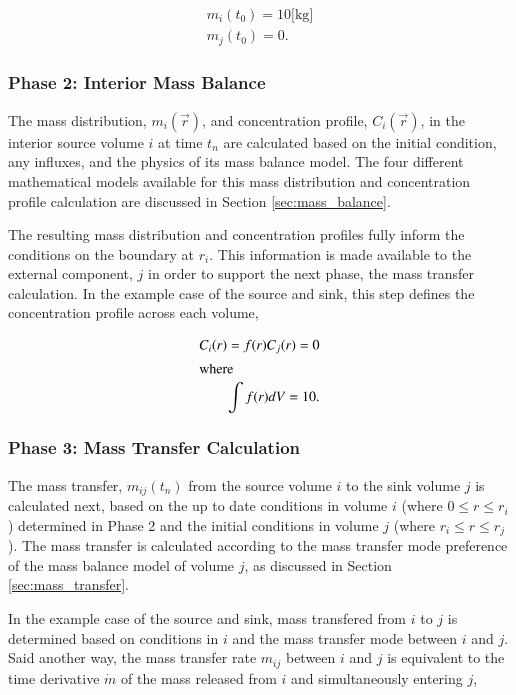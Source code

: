 \begin{align}
 m_i(t_0) = 10 \mbox{[kg]}\\
 m_j(t_0) = 0.
\end{align}

\subsubsection{Phase 2: Interior Mass Balance}

The mass distribution, $m_i(\vec{r})$, and concentration profile, 
$C_i(\vec{r})$, in the interior source volume $i$ at time $t_n$ are calculated 
based on the initial condition, any influxes, and the physics of its mass 
balance model.  The four different mathematical models available for this mass 
distribution and concentration profile calculation are discussed in Section 
\ref{sec:mass_balance}.

The resulting mass distribution and concentration profiles fully inform
the conditions on the boundary at $r_i$. This information is made available
to the external component, $j$ in order to support the next phase, the mass
transfer calculation. In the example case of the source and sink, this step 
defines the concentration profile across each volume,

\begin{align}
C_i(r) = f(r)
C_j(r) = 0\\
\intertext{where}
\int f(r)dV = 10.
\end{align}

\subsubsection{Phase 3: Mass Transfer Calculation}

The mass transfer, $m_{ij}(t_n)$ from the source volume $i$ to the sink volume 
$j$ is calculated next, based on the up to date conditions in volume $i$ (where 
$0\le r \le r_i$) determined in Phase 2 and the initial conditions in volume 
$j$ (where $r_i \le r \le r_j$). The mass transfer is calculated according to 
the mass transfer mode preference of the mass balance model of volume $j$, as 
discussed in Section \ref{sec:mass_transfer}.

In the example case of the source and sink, mass transfered from $i$ to $j$ is 
determined based on conditions in $i$ and the mass transfer mode between $i$ 
and $j$. Said another way, the mass transfer rate $m_{ij}$ between $i$ and $j$ 
is equivalent to the time derivative $\dot{m}$ of the mass released from $i$ and 
simultaneously entering $j$,

